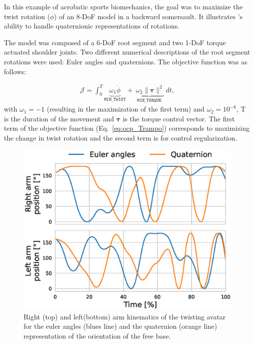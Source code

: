 In this example of acrobatic sports biomechanics, the goal was to maximize the twist rotation ($\phi$) of an 8-DoF model in a backward somersault. 
It illustrates \bioptim 's ability to handle quaternionic representations of rotations.

The model was composed of a 6-DoF root segment and two 1-DoF torque actuated shoulder joints.
Two different numerical descriptions of the root segment rotations were used: Euler angles and quaternions.
The objective function was as follows:

\begin{eqnarray}\label{eq:ocp_Trampo}
\mathcal{J} =  \int_0^T\underbrace{\omega_1 \dot{\phi}}_{\mathtt{MIN\_TWIST}}  + \underbrace{~\omega_2  \|\boldsymbol{\tau}\|^2}_{\mathtt{MIN\_ TORQUE}}~dt,
\end{eqnarray} 
with $\omega_1 = -1$ (resulting in the maximization of the first term) and $\omega_2 = 10^{-6}$, T is the duration of the movement and $\boldsymbol{\tau}$ is the torque control vector.
The first term of the objective function (Eq.~\ref{eq:ocp_Trampo}) corresponds to maximizing the change in twist rotation and the second term is for control regularization.
\begin{figure}[t!]
\centering
\includegraphics[width=\columnwidth]{figures/Twisting_armTech.eps}
\caption{Right (top) and left(bottom) arm kinematics of the twisting avatar for the euler angles (blues line) and the quaternion (orange line) representation of the orientation of the free base.}
\label{fig:Twist_armTech_graphs}
\vspace*{-1.5cm}
\end{figure}


